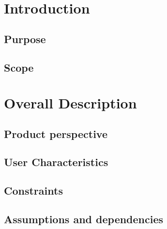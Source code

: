 


    
  \begin{titlepage}
    
  \end{titlepage}
  
  \tableofcontents
   
  \chapter{Introduction}
  \section{Purpose}
  
  \section{Scope}
  
  
  \chapter{Overall Description}
  \section{Product perspective}
  
  \section{User Characteristics}
  
  \section{Constraints}
  
  \section{Assumptions and dependencies}
  


  

